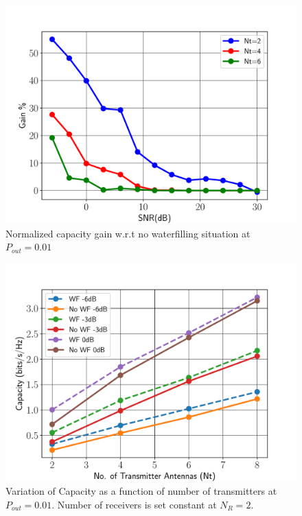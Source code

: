 \documentclass[11pt,a4paper]{report}
\def\imwidth{0.60}
\begin{document}
\begin{figure}
\begin{center}
\includegraphics[width=\imwidth\columnwidth]{images/cap_gain.pdf}
\caption{Normalized capacity gain w.r.t no waterfilling situation 
    at $P_{out}=0.01$}
\label{fig:cap_gain}
\end{center}
\end{figure}



\begin{figure}
\begin{center}
\includegraphics[width=\imwidth\columnwidth]{images/cap_vs_trans.pdf}
\caption{Variation of Capacity as a function of number of transmitters
    at $P_{out}=0.01$. Number of receivers is set constant at $N_R=2$.}
\label{fig:cap_gain}
\end{center}
\end{figure}



\end{document}
